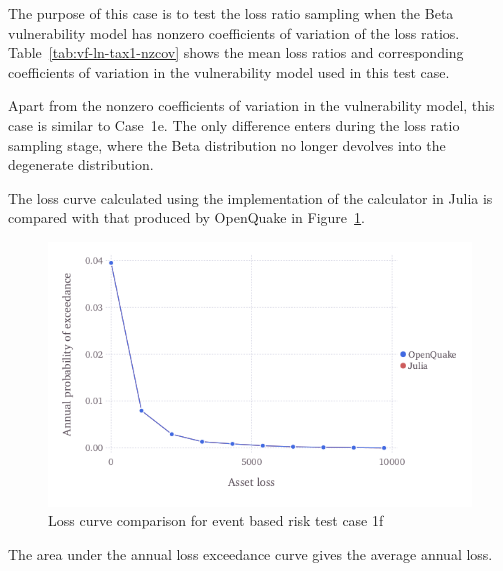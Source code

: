 The purpose of this case is to test the loss ratio sampling when the Beta vulnerability model has nonzero coefficients of variation of the loss ratios. Table~\ref{tab:vf-ln-tax1-nzcov} shows the mean loss ratios and corresponding coefficients of variation in the vulnerability model used in this test case.

Apart from the nonzero coefficients of variation in the vulnerability model, this case is similar to Case~1e. The only difference enters during the loss ratio sampling stage, where the Beta distribution no longer devolves into the degenerate distribution.

The loss curve calculated using the implementation of the calculator in Julia is compared with that produced by OpenQuake in Figure~\ref{fig:lc-ebr-1f}.

\begin{figure}[htbp]
\centering
\includegraphics[width=12cm]{qareport/figures/fig-lc-ebr-1f}
\caption{Loss curve comparison for event based risk test case 1f}
\label{fig:lc-ebr-1f}
\end{figure}

The area under the annual loss exceedance curve gives the average annual loss.